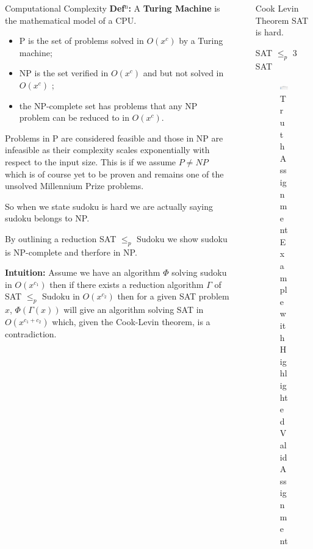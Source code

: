 \documentclass[final]{beamer}
\newlength{\sepwidth}
\newlength{\colwidth}
\newcounter{col}
\newcommand{\separatorcolumn}{\begin{column}{\sepwidth}\end{column}}
\begin{document}
\begin{frame}[t]
\begin{columns}[t]
\begin{column}{\colwidth}
\begin{block}{Computational Complexity}
\textbf{Def$^\text{n}$:} A \textbf{Turing Machine} is the mathematical model of a CPU.



 \begin{itemize}
	\item{P is the set of problems solved in $O(x^c)$ by a Turing machine;} 
	\item{NP is the set verified in $O(x^c)$ and but not solved in $O(x^c)$ ;} 
	\item{the NP-complete set has problems that any NP problem can be reduced to in $O(x^c)$.} 
\end{itemize}
Problems in P are considered feasible and those in NP are infeasible as their complexity scales exponentially with respect to the input size. This is if we assume $P\neq NP$ which is of course yet to be proven and remains one of the unsolved Millennium Prize problems. 

So when we state sudoku is hard we are actually saying sudoku belongs to NP.

By outlining a reduction SAT $ \leq_p $ Sudoku we show sudoku is NP-complete and therfore in NP. 

\textbf{Intuition:} Assume we have an algorithm $\Phi$ solving sudoku in $O(x^{c_1})$ then if there exists a reduction algorithm $\Gamma$ of SAT $ \leq_p $ Sudoku in $O(x^{c_2})$  then for a given SAT problem $x$, $\Phi(\Gamma(x))$ will give an algorithm solving SAT in $O(x^{c_1+c_2})$ which, given the Cook-Levin theorem, is a contradiction. 

  \end{block}

\end{column}

\separatorcolumn

\begin{column}{\colwidth}  
\begin{alertblock}{Cook Levin Theorem}
SAT is hard.
  \end{alertblock}
  \begin{block}{SAT $\leq_p$ 3 SAT}

\begin{figure}
		\includegraphics[width=60mm]{sat_example.png}
		\caption{Truth Assignment Example with Highlighted Valid Assignment}
		\vspace{-10pt}
\end{figure}


\end{block}
\end{column}
\end{columns}
\end{frame}
\end{document}
